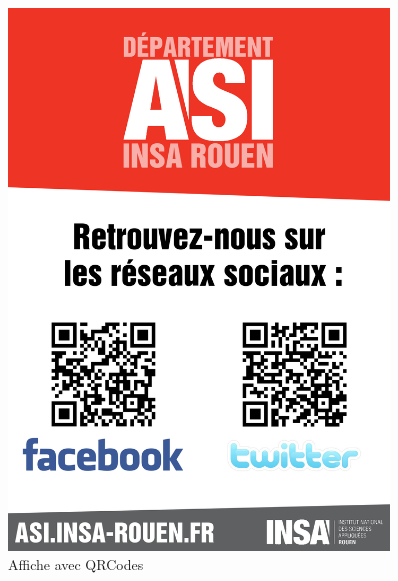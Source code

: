 		\begin{figure}
			\begin{center}
				\includegraphics[width=0.9\textwidth]{images/affiche.jpg}
				\caption{\label{affiche} Affiche avec QRCodes}
			\end{center}
		\end{figure}
